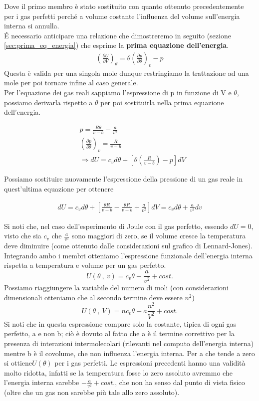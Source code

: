\documentclass[10pt,a4paper]{article}
\begin{document}
Dove il primo membro è stato sostituito con quanto ottenuto precedentemente per i gas perfetti perché a volume costante l'influenza del volume sull'energia interna si annulla.\\
\'{E} necessario anticipare una relazione che dimostreremo in seguito (sezione \ref{sec:prima_eq_energia}) che esprime la \textbf{prima equazione dell'energia}.
\begin{align}\label{eq:prima_eq_energia}
	\left(\frac{\partial U}{\partial V}\right)_{\theta} = \theta \left(\frac{\partial p}{\partial \theta}\right)_v - p 
\end{align}
Questa è valida per una singola mole dunque restringiamo la trattazione ad una mole per poi tornare infine al caso generale.\\
Per l'equazione dei gas reali sappiamo l'espressione di p in funzione di V e \(\theta\), possiamo derivarla rispetto a $\theta$ per poi sostituirla nella prima equazione dell'energia. 

\begin{align*} 
	&p = \frac{R\theta}{v-b}-\frac{a}{v^2}\\
	&\left(\frac{\partial p}{\partial \theta}\right)_v = \frac{R}{v-b}\\
	&\Rightarrow dU = c_v d\theta + \left[ \theta \left(\frac{R}{v-b}\right)-p \right]dV
\end{align*} 

Possiamo sostituire nuovamente l'espressione della pressione di un gas reale in quest'ultima equazione per ottenere

\begin{align*} 
	dU = c_v d\theta + \left[\frac{\theta R}{v-b}-\frac{\theta R}{v-b}+\frac{a}{v^2}\right] dV = c_v d\theta +\frac{a}{v^2}dv
\end{align*} 

Si noti che, nel caso dell'esperimento di Joule con il gas perfetto, essendo \(dU = 0\), visto che sia \(c_v\) che \(\frac{a}{v^2}\) sono maggiori di zero, se il volume cresce la temperatura deve diminuire (come ottenuto dalle considerazioni sul grafico di Lennard-Jones).\\
Integrando ambo i membri otteniamo l'espressione funzionale dell'energia interna rispetta a temperatura e volume per un gas perfetto. 
\[U(\theta\ ,\ v) = c_v\theta - \frac{a}{v^2}+ cost.\]
Possiamo riaggiungere la variabile del numero di moli (con considerazioni dimensionali otteniamo che al secondo termine deve essere \(n^2\))
\[U(\theta\ ,\ V) = n c_v\theta - a\frac{n^2}{V^2}+ cost.\]
Si noti che in questa espressione compare solo la costante, tipica di ogni gas perfetto, a e non b; ciò è dovuto al fatto che a è il termine correttivo per la presenza di interazioni intermolecolari (rilevanti nel computo dell'energia interna) mentre b è il covolume, che non influenza l'energia interna. Per a che tende a zero si ottiene\( U(\theta)\) per i gas perfetti. Le espressioni precedenti hanno una validità molto ridotta, infatti se la temperatura fosse lo zero assoluto avremmo che l'energia interna sarebbe \(-\frac{a}{v^2}+cost.\), che non ha senso dal punto di vista fisico (oltre che un gas non sarebbe più tale allo zero assoluto). 
\end{document}
